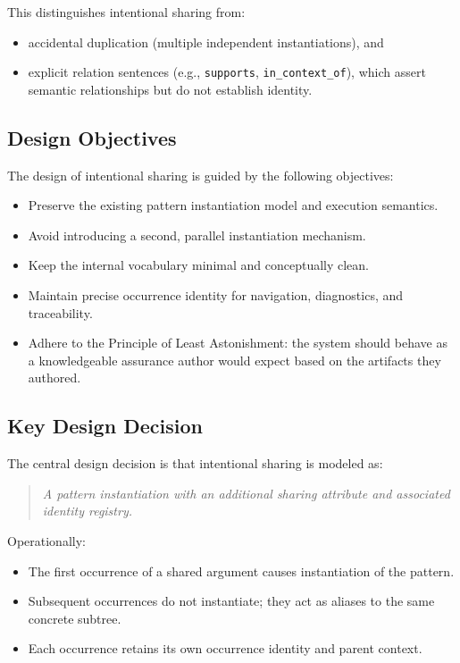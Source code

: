 \documentclass[12pt,twoside,a4paper]{article}
\begin{document}
This distinguishes intentional sharing from:
\begin{itemize}
  \item accidental duplication (multiple independent instantiations), and
  \item explicit relation sentences (e.g., \texttt{supports}, \texttt{in\_context\_of}), which assert semantic relationships but do not establish identity.
\end{itemize}

\subsection{Design Objectives}

The design of intentional sharing is guided by the following objectives:

\begin{itemize}
  \item Preserve the existing pattern instantiation model and execution semantics.
  \item Avoid introducing a second, parallel instantiation mechanism.
  \item Keep the internal vocabulary minimal and conceptually clean.
  \item Maintain precise occurrence identity for navigation, diagnostics, and traceability.
  \item Adhere to the Principle of Least Astonishment: the system should behave as a knowledgeable assurance author would expect based on the artifacts they authored.
\end{itemize}

\subsection{Key Design Decision}

The central design decision is that intentional sharing is modeled as:

\begin{quote}
\emph{A pattern instantiation with an additional sharing attribute and associated identity registry.}
\end{quote}

Operationally:
\begin{itemize}
  \item The first occurrence of a shared argument causes instantiation of the pattern.
  \item Subsequent occurrences do not instantiate; they act as aliases to the same concrete subtree.
  \item Each occurrence retains its own occurrence identity and parent context.
\end{itemize}
\end{document}
